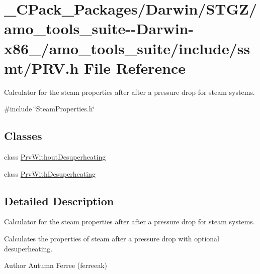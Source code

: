 \hypertarget{___c_pack___packages_2_darwin_2_s_t_g_z_2amo__tools__suite--_darwin-x86__64_2amo__tools__suite_2include_2ssmt_2_p_r_v_8h}{}\section{\+\_\+\+C\+Pack\+\_\+\+Packages/\+Darwin/\+S\+T\+G\+Z/amo\+\_\+tools\+\_\+suite-\/-\/\+Darwin-\/x86\+\_/amo\+\_\+tools\+\_\+suite/include/ssmt/\+P\+RV.h File Reference}
\label{___c_pack___packages_2_darwin_2_s_t_g_z_2amo__tools__suite--_darwin-x86__64_2amo__tools__suite_2include_2ssmt_2_p_r_v_8h}


Calculator for the steam properties after after a pressure drop for steam systems.  


{\ttfamily \#include \char`\"{}Steam\+Properties.\+h\char`\"{}}\newline
\subsection*{Classes}
\begin{DoxyCompactItemize}
\item 
class \hyperlink{class_prv_without_desuperheating}{Prv\+Without\+Desuperheating}
\item 
class \hyperlink{class_prv_with_desuperheating}{Prv\+With\+Desuperheating}
\end{DoxyCompactItemize}


\subsection{Detailed Description}
Calculator for the steam properties after after a pressure drop for steam systems. 

Calculates the properties of steam after a pressure drop with optional desuperheating.

\begin{DoxyAuthor}{Author}
Autumn Ferree (ferreeak) 
\end{DoxyAuthor}
